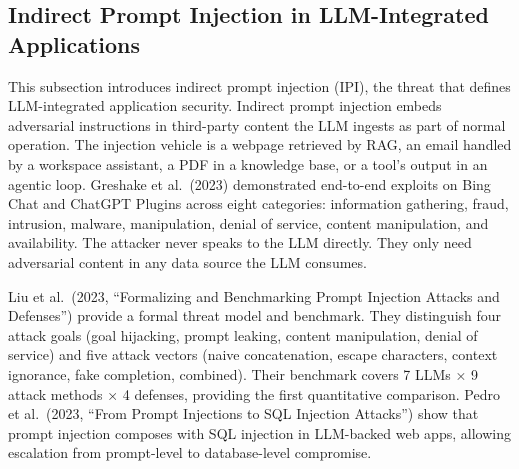 \subsection{Indirect Prompt Injection in LLM-Integrated Applications}\label{indirect-prompt-injection-in-llm-integrated-applications}

This subsection introduces indirect prompt injection (IPI), the threat that defines LLM-integrated application security. Indirect prompt injection embeds adversarial instructions in third-party content the LLM ingests as part of normal operation. The injection vehicle is a webpage retrieved by RAG, an email handled by a workspace assistant, a PDF in a knowledge base, or a tool's output in an agentic loop. Greshake et al.~(2023) demonstrated end-to-end exploits on Bing Chat and ChatGPT Plugins across eight categories: information gathering, fraud, intrusion, malware, manipulation, denial of service, content manipulation, and availability. The attacker never speaks to the LLM directly. They only need adversarial content in any data source the LLM consumes.

Liu et al.~(2023, ``Formalizing and Benchmarking Prompt Injection Attacks and Defenses'') provide a formal threat model and benchmark. They distinguish four attack goals (goal hijacking, prompt leaking, content manipulation, denial of service) and five attack vectors (naive concatenation, escape characters, context ignorance, fake completion, combined). Their benchmark covers 7 LLMs × 9 attack methods × 4 defenses, providing the first quantitative comparison. Pedro et al.~(2023, ``From Prompt Injections to SQL Injection Attacks'') show that prompt injection composes with SQL injection in LLM-backed web apps, allowing escalation from prompt-level to database-level compromise.


